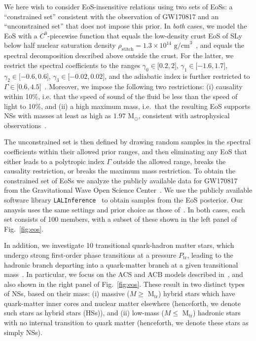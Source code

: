 \documentclass[prd,twocolumn,nofootinbib,superscriptaddress,amsmath,amssymb]{revtex4-1}
\begin{document}
We here wish to consider EoS-insensitive relations using two sets of EoSs: a ``constrained set'' consistent with the observation of GW170817 and an ``unconstrained set'' that does not impose this prior. In \emph{both} cases, we model the EoS with a $C^{0}$-piecewise function that equals the low-density crust EoS of SLy~\cite{Douchin:2001sv} below half nuclear saturation density $\rho_{\text{stitch}}=1.3 \times 10^{14} \text{ g/cm}^3$~\cite{Read2009}, and equals the spectral decomposition described above outside the crust. For the latter, we restrict the spectral coefficients to the ranges $\gamma_0 \in \lbrack 0.2,2 \rbrack$, $\gamma_1 \in \lbrack -1.6,1.7 \rbrack$, $\gamma_2 \in \lbrack -0.6,0.6 \rbrack$, $\gamma_3 \in \lbrack -0.02,0.02 \rbrack$, and the adiabatic index is further restricted to $\Gamma \in \lbrack 0.6,4.5 \rbrack$~\cite{Lindblom:parameters}. Moreover, we impose the following two restrictions:  (i) causality within 10\%, i.e. that the speed of sound of the fluid be less than the speed of light to 10\%, and (ii) a high maximum mass, i.e.~that the resulting EoS supports NSs with masses at least as high as $1.97 \text{ M}_{\odot}$, consistent with astrophysical observations~\cite{Zhao:massiveNS}. 

The unconstrained set is then defined by drawing random samples in the spectral coefficients within their allowed prior ranges, and then eliminating any EoS that either leads to a polytropic index $\Gamma$ outside the allowed range, breaks the causality restriction, or breaks the maximum mass restriction. 
To obtain the constrained set of EoSs we analyze the publicly available data for GW170817 from the Gravitational Wave Open Science Center~\cite{GWOSC,Vallisneri:2014vxa}. We use the publicly available software library {\tt LALInference}~\cite{Veitch:2014wba,lalinference_o2} to obtain samples from the EoS posterior. Our anaysis uses the same settings and prior choice as those of~\cite{LIGO:posterior,Carney:2018sdv}. 
In both cases, each set consists of 100 members, with a subset of these shown in the left panel of Fig.~\ref{fig:eos}.

In addition, we investigate 10 transitional quark-hadron matter stars, which undergo strong first-order phase transitions at a pressure $P_{\text{tr}}$, leading to the hadronic branch departing into a quark-matter branch at a given transitional mass~\cite{Paschalidis2018,Alford:2017qgh,1971SvA....15..347S,Zdunik:2012dj,Alford:2013aca}. In particular, we focus on the ACS and ACB models described in~\cite{Paschalidis2018}, and also shown in the right panel of Fig.~\ref{fig:eos}. These result in two distinct types of NSs, based on their mass: (i) massive ($M \geq \text{ M}_{\text{tr}}$) hybrid stars which have quark-matter inner cores and nuclear matter elsewhere (henceforth, we denote such stars as hybrid stars (HSs)), and (ii) low-mass ($M \leq \text{ M}_{\text{tr}}$) hadronic stars with no internal transition to quark matter (henceforth, we denote these stars as simply NSs).
\end{document}
